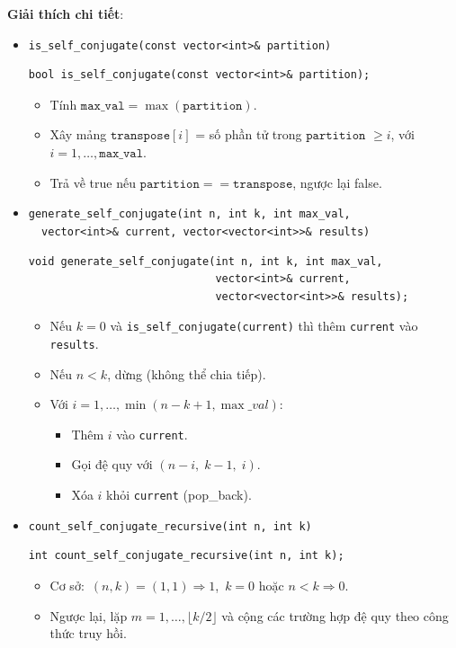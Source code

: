 \documentclass[a4paper,12pt]{article}
\begin{document}
\textbf{Giải thích chi tiết}:
\begin{itemize}

  \item \texttt{is\_self\_conjugate(const vector<int>\& partition)}  
    \begin{lstlisting}[style=cppstyle]
bool is_self_conjugate(const vector<int>& partition);
    \end{lstlisting}
    \begin{itemize}
      \item Tính \(\texttt{max\_val} = \max(\texttt{partition})\).  
      \item Xây mảng \(\texttt{transpose}[i]\) = số phần tử trong \(\texttt{partition}\) \(\ge i\), với \(i=1,\dots,\texttt{max\_val}\).  
      \item Trả về true nếu \(\texttt{partition} == \texttt{transpose}\), ngược lại false.
    \end{itemize}

  \item \texttt{generate\_self\_conjugate(int n, int k, int max\_val,\\
        \ \ vector<int>\& current, vector<vector<int>>\& results)}  
    \begin{lstlisting}[style=cppstyle]
void generate_self_conjugate(int n, int k, int max_val,
                             vector<int>& current,
                             vector<vector<int>>& results);
    \end{lstlisting}
    \begin{itemize}
      \item Nếu \(k=0\) và \texttt{is\_self\_conjugate(current)} thì thêm \texttt{current} vào \texttt{results}.  
      \item Nếu \(n<k\), dừng (không thể chia tiếp).  
      \item Với \(i=1,\dots,\min(n-k+1,\max\_val)\):
        \begin{itemize}
          \item Thêm \(i\) vào \texttt{current}.  
          \item Gọi đệ quy với \((n-i,\;k-1,\;i)\).  
          \item Xóa \(i\) khỏi \texttt{current} (pop\_back).
        \end{itemize}
    \end{itemize}

  \item \texttt{count\_self\_conjugate\_recursive(int n, int k)}  
    \begin{lstlisting}[style=cppstyle]
int count_self_conjugate_recursive(int n, int k);
    \end{lstlisting}
    \begin{itemize}
      \item Cơ sở:  
        \(\,(n,k)=(1,1)\Rightarrow1\),  
        \(\,k=0\) hoặc \(n<k\Rightarrow0\).  
      \item Ngược lại, lặp \(m=1,\dots,\lfloor k/2\rfloor\) và cộng các trường hợp đệ quy theo công thức truy hồi.
    \end{itemize}


\end{itemize}
\end{document}
